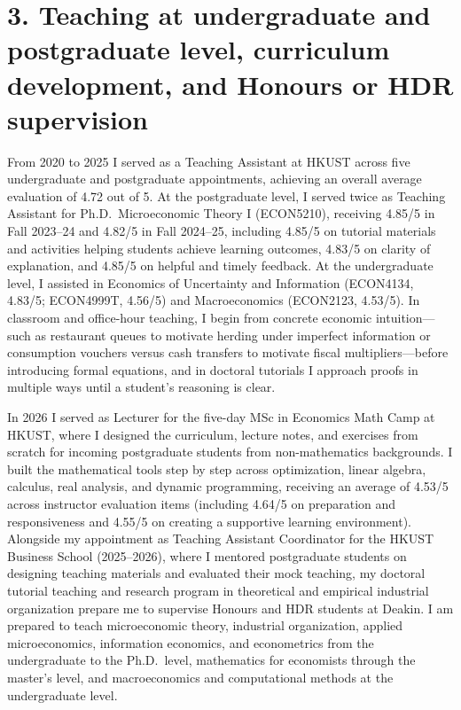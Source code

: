 \documentclass[11pt]{article}
\begin{document}
\section*{3. Teaching at undergraduate and postgraduate level, curriculum development, and Honours or HDR supervision}

From 2020 to 2025 I served as a Teaching Assistant at HKUST across five undergraduate and postgraduate appointments, achieving an overall average evaluation of 4.72 out of 5. At the postgraduate level, I served twice as Teaching Assistant for Ph.D.\ Microeconomic Theory I (ECON5210), receiving 4.85/5 in Fall 2023--24 and 4.82/5 in Fall 2024--25, including 4.85/5 on tutorial materials and activities helping students achieve learning outcomes, 4.83/5 on clarity of explanation, and 4.85/5 on helpful and timely feedback. At the undergraduate level, I assisted in Economics of Uncertainty and Information (ECON4134, 4.83/5; ECON4999T, 4.56/5) and Macroeconomics (ECON2123, 4.53/5). In classroom and office-hour teaching, I begin from concrete economic intuition---such as restaurant queues to motivate herding under imperfect information or consumption vouchers versus cash transfers to motivate fiscal multipliers---before introducing formal equations, and in doctoral tutorials I approach proofs in multiple ways until a student's reasoning is clear.

In 2026 I served as Lecturer for the five-day MSc in Economics Math Camp at HKUST, where I designed the curriculum, lecture notes, and exercises from scratch for incoming postgraduate students from non-mathematics backgrounds. I built the mathematical tools step by step across optimization, linear algebra, calculus, real analysis, and dynamic programming, receiving an average of 4.53/5 across instructor evaluation items (including 4.64/5 on preparation and responsiveness and 4.55/5 on creating a supportive learning environment). Alongside my appointment as Teaching Assistant Coordinator for the HKUST Business School (2025--2026), where I mentored postgraduate students on designing teaching materials and evaluated their mock teaching, my doctoral tutorial teaching and research program in theoretical and empirical industrial organization prepare me to supervise Honours and HDR students at Deakin. I am prepared to teach microeconomic theory, industrial organization, applied microeconomics, information economics, and econometrics from the undergraduate to the Ph.D.\ level, mathematics for economists through the master's level, and macroeconomics and computational methods at the undergraduate level.
\end{document}
